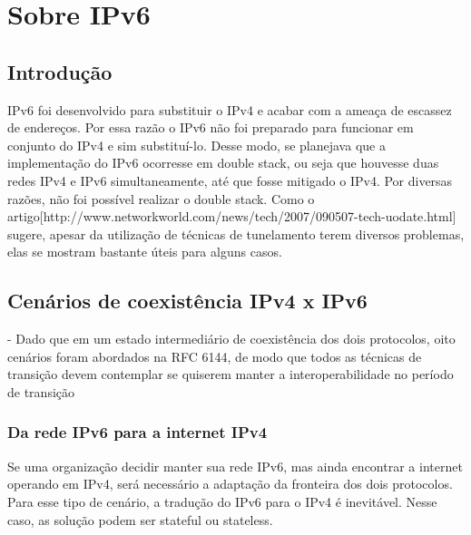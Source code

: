 \documentclass[
	12pt,				%
	oneside,			%
	a4paper,			%
	english,			%
	brazil,				%
	]{ime-abntex2}
\begin{document}



\imprimircapa
%

\tableofcontents*
\cleardoublepage


\textual

\chapter{Sobre IPv6}

\section{Introdução}
IPv6 foi desenvolvido para substituir o IPv4 e acabar com a ameaça de escassez de endereços. Por essa razão o IPv6 não foi preparado para funcionar em conjunto do IPv4 e sim substituí-lo. Desse modo, se planejava que a implementação do IPv6 ocorresse em double stack, ou seja que houvesse duas redes IPv4 e IPv6 simultaneamente, até que fosse mitigado o IPv4. Por diversas razões, não foi possível realizar o double stack. Como o artigo[http://www.networkworld.com/news/tech/2007/090507-tech-uodate.html] sugere, apesar da utilização de técnicas de tunelamento terem diversos problemas, elas se mostram bastante úteis para alguns casos.


\section{Cenários de coexistência IPv4 x IPv6}
- Dado que em um estado intermediário de coexistência dos dois protocolos, oito cenários foram abordados na RFC 6144, de modo que todos as técnicas de transição devem contemplar se quiserem manter a interoperabilidade no período de transição

\subsection{Da rede IPv6 para a internet IPv4}
Se uma organização decidir manter sua rede IPv6, mas ainda encontrar a internet operando em IPv4, será necessário a adaptação da fronteira dos dois protocolos. Para esse tipo de cenário, a tradução do IPv6 para o IPv4 é inevitável. Nesse caso, as solução podem ser stateful ou stateless.
\end{document}
